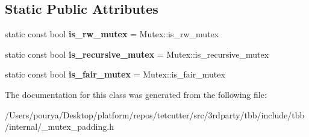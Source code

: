\subsection*{Static Public Attributes}
\begin{DoxyCompactItemize}
\item 
\hypertarget{classtbb_1_1interface7_1_1internal_1_1padded__mutex_3_01Mutex_00_01true_01_4_a445c871940d36a219bff3a0e88476657}{}static const bool {\bfseries is\+\_\+rw\+\_\+mutex} = Mutex\+::is\+\_\+rw\+\_\+mutex\label{classtbb_1_1interface7_1_1internal_1_1padded__mutex_3_01Mutex_00_01true_01_4_a445c871940d36a219bff3a0e88476657}

\item 
\hypertarget{classtbb_1_1interface7_1_1internal_1_1padded__mutex_3_01Mutex_00_01true_01_4_a63aafd7c45ced6c267509c6ca00b1247}{}static const bool {\bfseries is\+\_\+recursive\+\_\+mutex} = Mutex\+::is\+\_\+recursive\+\_\+mutex\label{classtbb_1_1interface7_1_1internal_1_1padded__mutex_3_01Mutex_00_01true_01_4_a63aafd7c45ced6c267509c6ca00b1247}

\item 
\hypertarget{classtbb_1_1interface7_1_1internal_1_1padded__mutex_3_01Mutex_00_01true_01_4_a38bdfff2390c98657ae4731db3936a3e}{}static const bool {\bfseries is\+\_\+fair\+\_\+mutex} = Mutex\+::is\+\_\+fair\+\_\+mutex\label{classtbb_1_1interface7_1_1internal_1_1padded__mutex_3_01Mutex_00_01true_01_4_a38bdfff2390c98657ae4731db3936a3e}

\end{DoxyCompactItemize}


The documentation for this class was generated from the following file\+:\begin{DoxyCompactItemize}
\item 
/\+Users/pourya/\+Desktop/platform/repos/tetcutter/src/3rdparty/tbb/include/tbb/internal/\+\_\+mutex\+\_\+padding.\+h\end{DoxyCompactItemize}
